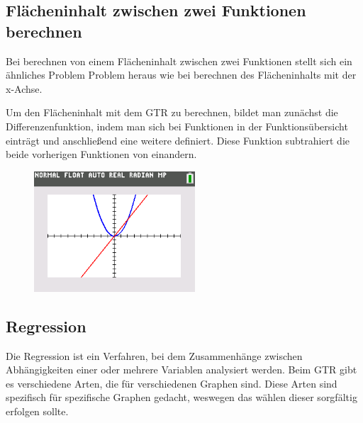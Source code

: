 \subsection{Flächeninhalt zwischen zwei Funktionen berechnen}\label{sec:Flaecheninhalt zwischen zwei Funktionen berechnen}
Bei berechnen von einem Flächeninhalt zwischen zwei Funktionen stellt sich ein ähnliches Problem Problem heraus wie bei berechnen des Flächeninhalts mit der x-Achse.
\begin{paracol}{2}
	\begin{flushleft}
	Um den Flächeninhalt mit dem GTR zu berechnen, bildet man zunächst die Differenzenfunktion, indem man sich bei Funktionen in der Funktionsübersicht einträgt und anschließend eine weitere definiert. Diese Funktion subtrahiert die beide vorherigen Funktionen von einandern. 
	\end{flushleft}
\switchcolumn
	\begin{flushright}
		\begin{figure}
			\includegraphics[width=6cm]{Media/GRT/Visualisierung/Flaecheninhalt_zwischen_zwei_Funktionen_berechnen/Flaecheninhalt_zwischen_zwei_Funktionen_berechnen.png}
		\caption{}
		\end{figure}
	\end{flushright}
\end{paracol}
\pagebreak
\subsection{Regression}\label{sec:Regression}
Die Regression ist ein Verfahren, bei dem Zusammenhänge zwischen Abhängigkeiten einer oder mehrere Variablen analysiert werden. Beim GTR gibt es verschiedene Arten, die für verschiedenen Graphen sind. Diese Arten sind spezifisch für spezifische Graphen gedacht, weswegen das wählen dieser sorgfältig erfolgen sollte. 

